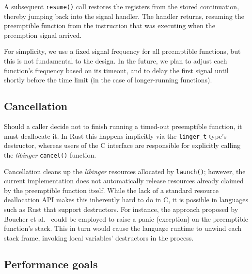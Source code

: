 A subsequent \texttt{resume()} call restores the registers from the stored
continuation, thereby jumping back into the signal handler.  The handler
returns, resuming the preemptible function from the instruction that was executing
when the preemption signal arrived.

For simplicity, we use a fixed signal frequency for all preemptible
functions, but this is not fundamental to the design.  In the future, we plan to
adjust each function's frequency based on its timeout, and to delay the first signal
until
shortly before the time limit (in the case of longer-running functions).




\subsection{Cancellation}

Should a caller decide not to finish running a timed-out preemptible function, it
must deallocate it.  In Rust this happens implicitly via the \texttt{linger\_t}
type's destructor, whereas users of the C interface are responsible for explicitly
calling the \textit{libinger} \texttt{cancel()} function.

Cancellation cleans up the \textit{libinger} resources allocated by
\texttt{launch()};
however, the current implementation
does not automatically release resources already claimed by the
preemptible function itself.  While the lack of a standard resource deallocation API
makes this inherently hard to do in C, it is possible in languages
such as Rust that support destructors.  For instance, the approach proposed by
Boucher et al.~\cite{boucher:atc2018} could be employed to raise a panic
(exception) on the preemptible function's stack.  This in turn would cause the
language runtime
to unwind each stack frame, invoking local variables' destructors in
the process.


\subsection{Performance goals}


